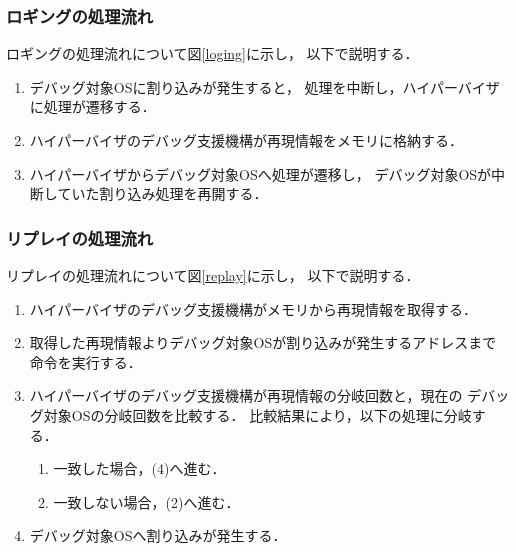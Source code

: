 \documentclass[submit,techreq,noauthor,dvipdfmx]{ipsj}
\begin{document}
\subsubsection{ロギングの処理流れ}


ロギングの処理流れについて図\ref{loging}に示し，
以下で説明する．

\begin{enumerate}
    \item 
        デバッグ対象OSに割り込みが発生すると，
        処理を中断し，ハイパーバイザに処理が遷移する．
    \item 
        ハイパーバイザのデバッグ支援機構が再現情報をメモリに格納する．
    \item 
        ハイパーバイザからデバッグ対象OSへ処理が遷移し，
        デバッグ対象OSが中断していた割り込み処理を再開する．
\end{enumerate}

\subsubsection{リプレイの処理流れ}


リプレイの処理流れについて図\ref{replay}に示し，
以下で説明する．
\begin{enumerate}
    \item 
        ハイパーバイザのデバッグ支援機構がメモリから再現情報を取得する．
    \item 
        取得した再現情報よりデバッグ対象OSが割り込みが発生するアドレスまで
        命令を実行する．
    \item 
        ハイパーバイザのデバッグ支援機構が再現情報の分岐回数と，現在の
        デバッグ対象OSの分岐回数を比較する．
        比較結果により，以下の処理に分岐する．
        \begin{enumerate}
            \item 一致した場合，(4)へ進む．
            \item 一致しない場合，(2)へ進む．
        \end{enumerate}
    \item 
        デバッグ対象OSへ割り込みが発生する．
\end{enumerate}
\end{document}
